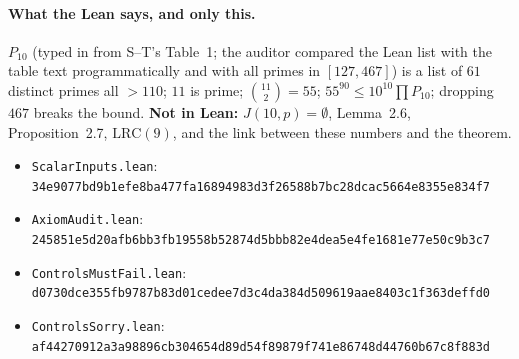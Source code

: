 \documentclass[10pt]{article}
\newcommand{\LRC}[1]{\mathrm{LRC}(#1)}
\begin{document}
\paragraph{What the Lean says, and only this.} $P_{10}$ (typed in from S--T's Table~1; the auditor compared the Lean list with the table text programmatically and with all primes in $[127,467]$) is a list of $61$ distinct primes all $>110$; $11$ is prime; $\binom{11}2=55$; $55^{90}\le10^{10}\prod P_{10}$; dropping $467$ breaks the bound. \textbf{Not in Lean:} $J(10,p)=\emptyset$, Lemma~2.6, Proposition~2.7, $\LRC9$, and the link between these numbers and the theorem.
\begin{itemize}\scriptsize\itemsep=0pt
\item \texttt{ScalarInputs.lean}: \texttt{34e9077bd9b1efe8ba477fa16894983d3f26588b7bc28dcac5664e8355e834f7}
\item \texttt{AxiomAudit.lean}: \texttt{245851e5d20afb6bb3fb19558b52874d5bbb82e4dea5e4fe1681e77e50c9b3c7}
\item \texttt{ControlsMustFail.lean}: \texttt{d0730dce355fb9787b83d01cedee7d3c4da384d509619aae8403c1f363deffd0}
\item \texttt{ControlsSorry.lean}: \texttt{af44270912a3a98896cb304654d89d54f89879f741e86748d44760b67c8f883d}
\end{itemize}

\end{document}
